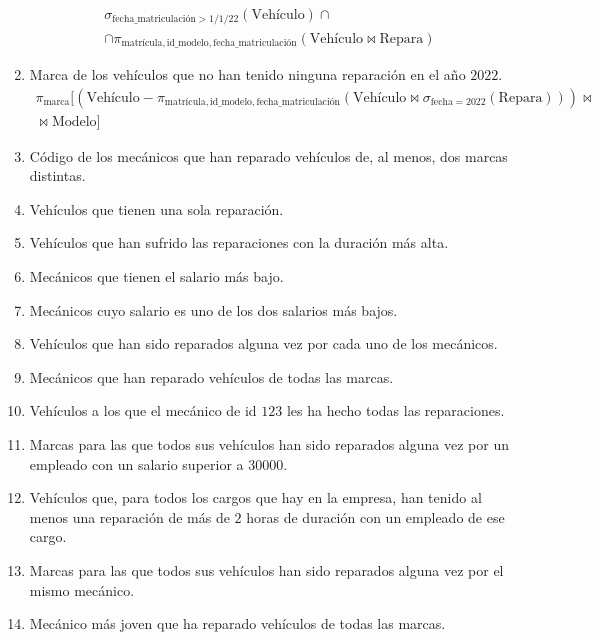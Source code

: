\begin{ejercicio}
\begin{enumerate}
\begin{multline*}
            \sigma_{\text{fecha\_matriculación} > 1/1/22}(\text{Vehículo}) \cap\\ \cap \pi_{\text{matrícula},\text{id\_modelo}, \text{fecha\_matriculación}}(\text{Vehículo}\bowtie \text{Repara})
        \end{multline*}
        \item Marca de los vehículos que no han tenido ninguna reparación en el año $2022$.
        \begin{multline*}
            \pi_{\text{marca}}[(\text{Vehículo} - \pi_{\text{matrícula},\text{id\_modelo}, \text{fecha\_matriculación}}(\text{Vehículo} \bowtie \sigma_{\text{fecha}=2022}(\text{Repara})))\bowtie\\\bowtie \text{Modelo}]
        \end{multline*}
        \item Código de los mecánicos que han reparado vehículos de, al menos, dos marcas distintas.
        \item Vehículos que tienen una sola reparación.
        \item Vehículos que han sufrido las reparaciones con la duración más alta.
        \item Mecánicos que tienen el salario más bajo.
        \item Mecánicos cuyo salario es uno de los dos salarios más bajos.
        \item Vehículos que han sido reparados alguna vez por cada uno de los mecánicos.
        \item Mecánicos que han reparado vehículos de todas las marcas.
        \item Vehículos a los que el mecánico de id $123$ les ha hecho todas las reparaciones.
        \item Marcas para las que todos sus vehículos han sido reparados alguna vez por un empleado con un salario superior a $30000$.
        \item Vehículos que, para todos los cargos que hay en la empresa, han tenido al menos una reparación de más de $2$ horas de duración con un empleado de ese cargo.
        \item Marcas para las que todos sus vehículos han sido reparados alguna vez por el mismo mecánico.
        \item Mecánico más joven que ha reparado vehículos de todas las marcas.
    \end{enumerate}

\end{ejercicio}




